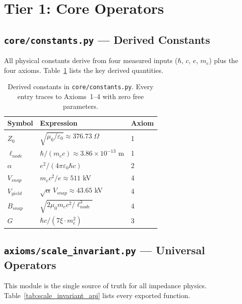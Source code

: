 \section{Tier 1: Core Operators}
\label{sec:tier1_core}

\subsection{\texttt{core/constants.py} --- Derived Constants}

All physical constants derive from four measured inputs
($\hbar$, $c$, $e$, $m_e$) plus the four axioms.
Table~\ref{tab:engine_constants} lists the key derived quantities.

\begin{table}[H]
\centering\small
\caption{Derived constants in \texttt{core/constants.py}.
Every entry traces to Axioms~1--4 with zero free parameters.}
\label{tab:engine_constants}
\begin{tabular}{lll}
\toprule
\textbf{Symbol} & \textbf{Expression} & \textbf{Axiom} \\
\midrule
$Z_0$        & $\sqrt{\mu_0/\varepsilon_0} \approx 376.73\;\Omega$ & 1 \\
$\ell_{node}$ & $\hbar/(m_e c) \approx 3.86 \times 10^{-13}$ m     & 1 \\
$\alpha$      & $e^2/(4\pi\varepsilon_0\hbar c)$                    & 2 \\
$V_{snap}$    & $m_e c^2/e \approx 511$ kV                        & 4 \\
$V_{yield}$   & $\sqrt{\alpha}\,V_{snap} \approx 43.65$ kV          & 4 \\
$B_{snap}$    & $\sqrt{2\mu_0 m_e c^2 / \ell_{node}^3}$             & 4 \\
$G$           & $\hbar c / (7\xi \cdot m_e^2)$                      & 3 \\
\bottomrule
\end{tabular}
\end{table}


\subsection{\texttt{axioms/scale\_invariant.py} --- Universal Operators}

This module is the single source of truth for all impedance physics.
Table~\ref{tab:scale_invariant_api} lists every exported function.

